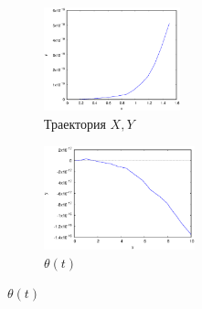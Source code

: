 \begin{figure}
    \centering
    \begin{subfigure}[t]{0.3\textwidth}
        \centering
        \includegraphics[width=\linewidth, height=30mm]{pic/_sol__1_0_0__0__10__1e2_trajectory}
        \caption{Траектория $X, Y$}
        \label{fig:_sol__1_0_0__0__10__1e2_trajectory}
    \end{subfigure}
    \begin{subfigure}[t]{0.3\textwidth}
        \centering
        \includegraphics[width=\linewidth, height=30mm]{pic/_sol__1_0_0__0__10__1e2_theta}
        \caption{$\theta(t)$}
        \label{fig:_sol__1_0_0__0__10__1e2_theta}
    \end{subfigure}
    \vspace{12pt}
    

\end{figure}
